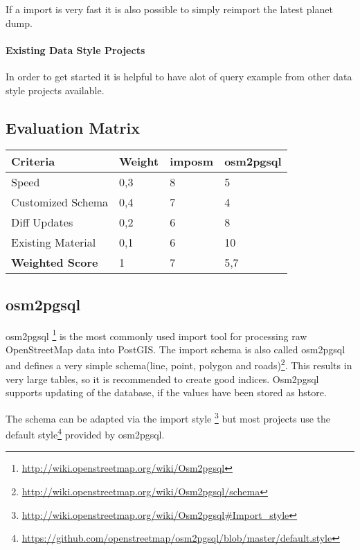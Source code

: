 If a import is very fast it is also possible to simply reimport the latest
planet dump.

\paragraph{Existing Data Style Projects}
In order to get started it is helpful to have alot of query example
from other data style projects available.

\subsection{Evaluation Matrix}

\begin{center}
    \begin{tabular}{llll}
    \hline
    Criteria         & Weight & imposm & osm2pgsql \\
    \hline
    Speed             & 0,3    & 8      & 5         \\
    Customized Schema & 0,4    & 7      & 4         \\
    Diff Updates      & 0,2    & 6      & 8         \\
    Existing Material & 0,1    & 6      & 10        \\
    \hline
    \textbf{Weighted Score} & 1      & 7      & 5,7       \\
    \end{tabular}
\end{center}


\subsection{osm2pgsql}\label{osm2pgsql-importer}

osm2pgsql \footnote{\url{http://wiki.openstreetmap.org/wiki/Osm2pgsql}} is the
most commonly used import tool for processing raw OpenStreetMap data into PostGIS.
The import schema is also called osm2pgsql and defines a very
simple schema(line, point, polygon and
roads)\footnote{\url{http://wiki.openstreetmap.org/wiki/Osm2pgsql/schema}}.
This results in very large tables, so it is recommended to create good
indices. Osm2pgsql supports updating of the database, if the values have
been stored as hstore.

The schema can be adapted via the import style \footnote{\url{http://wiki.openstreetmap.org/wiki/Osm2pgsql\#Import_style}}
but most projects use the default style\footnote{\url{https://github.com/openstreetmap/osm2pgsql/blob/master/default.style}} provided by osm2pgsql.

